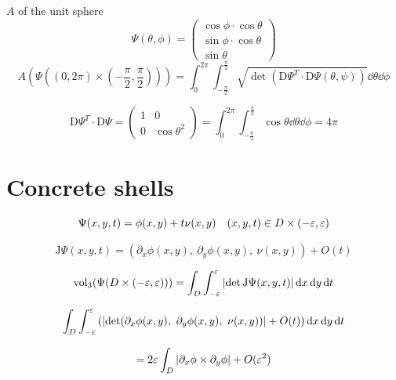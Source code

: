 \documentclass[12pt]{article}
\begin{document}
\begin{example}{$A$ of the unit sphere}{}
    $$
        \Psi(\theta, \phi) = \begin{pmatrix} \cos\phi \cdot \cos\theta \\ \sin\phi\cdot\cos\theta \\ \sin\theta \end{pmatrix}
    $$ 
    $$
        A(\Psi\left((0, 2\pi) \times (-\frac{\pi}{2}, \frac{\pi}{2})\right)) = \int_{0}^{2\pi} \int_{-\frac{\pi}{2}}^{\frac{\pi}{2}} \sqrt{\det(\mathrm{D}\Psi^T \cdot \mathrm{D}\Psi(\theta, \psi))} \dd \theta \dd \phi
    $$

    $$
        \mathrm{D}\Psi^T \cdot \mathrm{D}\Psi = \begin{pmatrix}
            1 & 0 \\
            0 & \cos\theta^2
        \end{pmatrix} = \int_{0}^{2\pi} \int_{-\frac{\pi}{2}}^{\frac{\pi}{2}} \cos \theta \dd \theta \dd \phi = \boxed{4\pi}
    $$

\end{example}

\section*{Concrete shells}

$$
    \Psi(x, y, t) = \phi(x, y) + t \nu(x, y) \quad (x, y, t) \in D \times (-\varepsilon, \varepsilon)
$$

$$
    \mathrm{J}\Psi(x, y, t) = (\partial_x \phi(x, y),\ \partial_y \phi(x, y),\ \nu(x, y) ) + O(t)
$$

$$
    \mathrm{vol}_3(\Psi(D \times (-\varepsilon, \varepsilon))) = \int_{D} \int_{-\varepsilon}^{\varepsilon} \left|\det \mathrm{J}\Psi(x, y, t)\right| \mathop{}\!\mathrm{d} x \mathop{}\!\mathrm{d} y \mathop{}\!\mathrm{d} t
$$

$$
    \int_{D} \int_{-\varepsilon}^{\varepsilon} \left( \left|\det (\partial_x \phi(x, y),\ \partial_y \phi(x, y),\ \nu(x, y) ) \right| + O(t) \right) \mathop{}\!\mathrm{d} x \mathop{}\!\mathrm{d} y \mathop{}\!\mathrm{d} t
$$

$$
= 2 \varepsilon \int_{D} \left|\partial_x \phi \times \partial_y \phi\right| + O(\varepsilon^2)
$$
\end{document}
